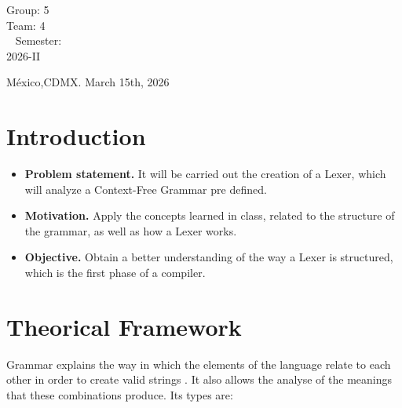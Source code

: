 \documentclass[letterpaper,12pt,oneside]{article}
\begin{document}
\begin{titlepage}
\begin{center}
\begin{center}
				\bigskip
				
				Group: 5\\
				Team: 4\\\
				Semester: \\
                2026-II
			\end{center}
			
			\vfill
			
			\begin{center}
				{México,CDMX. March 15th, 2026}\\
			\end{center}
			\cleardoublepage
		\end{center}
	\end{titlepage}
 
\tableofcontents
\clearpage
    

\section{Introduction} %

\begin{itemize}
    \item \textbf{Problem statement.} It will be carried out the creation of a Lexer, which will analyze a Context-Free Grammar pre defined. 
    \item \textbf{Motivation.} Apply the concepts learned in class, related to the structure of the grammar, as well as how a Lexer works.
    \item \textbf{Objective.} Obtain a better understanding of the way a Lexer is structured, which is the first phase of a compiler.
\end{itemize}

\section{Theorical Framework}

Grammar explains the way in which the elements of the language relate to each other in order to create valid strings \cite{unam_gramatica}. It also allows the analyse of the meanings that these combinations produce. Its types are:
\end{document}
